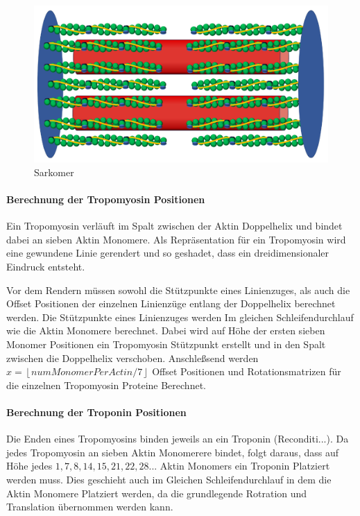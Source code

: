 \documentclass[a4paper,m]{cgBA}
\begin{document}
\begin{figure}[h]
\center
\includegraphics[width=1\textwidth]{Graphics/Sarkomer.pdf}
\caption{Sarkomer}
\label{fig:Sarkomer}
\end{figure}

\paragraph{Berechnung der Tropomyosin Positionen}

Ein Tropomyosin verläuft im Spalt zwischen der Aktin Doppelhelix und bindet dabei an sieben Aktin Monomere. Als Repräsentation für ein Tropomyosin wird eine gewundene Linie gerendert und so geshadet, dass ein dreidimensionaler Eindruck entsteht.

Vor dem Rendern müssen sowohl die Stützpunkte eines Linienzuges, als auch die Offset Positionen der einzelnen Linienzüge entlang der Doppelhelix berechnet werden. Die Stützpunkte eines Linienzuges werden Im gleichen Schleifendurchlauf wie die Aktin Monomere berechnet. Dabei wird auf Höhe der ersten sieben Monomer Positionen ein Tropomyosin Stützpunkt erstellt und in den Spalt zwischen die Doppelhelix verschoben.
Anschleßsend werden \(x = \left \lfloor{numMonomerPerActin / 7} \right \rfloor\) Offset Positionen und Rotationsmatrizen für die einzelnen Tropomyosin Proteine Berechnet. 

\paragraph{Berechnung der Troponin Positionen}

Die Enden eines Tropomyosins binden jeweils an ein Troponin (Reconditi...). Da jedes Tropomyosin an sieben Aktin Monomerere bindet, folgt daraus, dass auf Höhe jedes \(1,7,8,14,15,21,22,28...\) Aktin Monomers ein Troponin Platziert werden muss. Dies geschieht auch im Gleichen Schleifendurchlauf in dem die Aktin Monomere Platziert werden, da die grundlegende Rotration und Translation übernommen werden kann.
\end{document}
